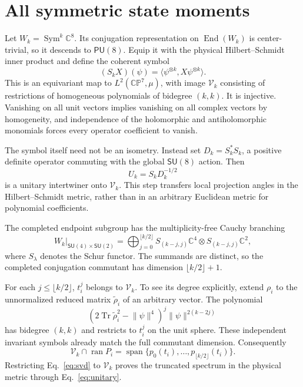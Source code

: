 \documentclass[aps,pra,reprint,amsmath,amssymb,longbibliography]{revtex4-2}
\newcommand{\C}{\mathbb C}
\newcommand{\CP}{\mathbb {CP}}
\newcommand{\Tr}{\operatorname{Tr}}
\newcommand{\Sym}{\operatorname{Sym}}
\newcommand{\End}{\operatorname{End}}
\newcommand{\ran}{\operatorname{ran}}
\newcommand{\SU}{\mathsf{SU}}
\newcommand{\PU}{\mathsf{PU}}
\newcommand{\norm}[1]{\lVert #1\rVert}
\begin{document}
\section{All symmetric state moments}
\label{sec:finite}

Let $W_k=\Sym^k\C^8$. Its conjugation representation on $\End(W_k)$ is center-trivial, so it descends to $\PU(8)$. Equip it with the physical Hilbert--Schmidt inner product and define the coherent symbol
\begin{equation}
 (S_kX)(\psi)=\langle\psi^{\otimes k},X\psi^{\otimes k}\rangle.
\label{eq:symbol}
\end{equation}
This is an equivariant map to $L^2(\CP^7,\mu)$, with image $\mathcal V_k$ consisting of restrictions of homogeneous polynomials of bidegree $(k,k)$. It is injective. Vanishing on all unit vectors implies vanishing on all complex vectors by homogeneity, and independence of the holomorphic and antiholomorphic monomials forces every operator coefficient to vanish.

The symbol itself need not be an isometry. Instead set $D_k=S_k^*S_k$, a positive definite operator commuting with the global $\SU(8)$ action. Then
\begin{equation}
 U_k=S_kD_k^{-1/2}
\label{eq:unitary}
\end{equation}
is a unitary intertwiner onto $\mathcal V_k$. This step transfers local projection angles in the Hilbert--Schmidt metric, rather than in an arbitrary Euclidean metric for polynomial coefficients.

The completed endpoint subgroup has the multiplicity-free Cauchy branching
\begin{equation}
 W_k\big|_{\SU(4)\times\SU(2)}
 =\bigoplus_{j=0}^{\lfloor k/2\rfloor}
 S_{(k-j,j)}\C^4\otimes S_{(k-j,j)}\C^2,
\label{eq:branch}
\end{equation}
where $S_\lambda$ denotes the Schur functor. The summands are distinct, so the completed conjugation commutant has dimension $\lfloor k/2\rfloor+1$.

For each $j\leq\lfloor k/2\rfloor$, $t_i^j$ belongs to $\mathcal V_k$. To see its degree explicitly, extend $\rho_i$ to the unnormalized reduced matrix $\widetilde\rho_i$ of an arbitrary vector. The polynomial
\begin{equation}
 \left(2\Tr\widetilde\rho_i^2-\norm\psi^4\right)^j
                  \norm\psi^{2(k-2j)}
\end{equation}
has bidegree $(k,k)$ and restricts to $t_i^j$ on the unit sphere. These independent invariant symbols already match the full commutant dimension. Consequently
\begin{equation}
 \mathcal V_k\cap\ran P_i
 =\operatorname{span}\{p_0(t_i),\ldots,p_{\lfloor k/2\rfloor}(t_i)\}.
\end{equation}
Restricting Eq.~\eqref{eq:svd} to $\mathcal V_k$ proves the truncated spectrum in the physical metric through Eq.~\eqref{eq:unitary}.
\end{document}
